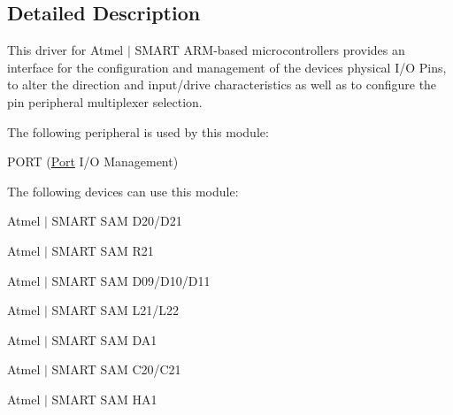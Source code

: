 \subsection{Detailed Description}
This driver for Atmel\textregistered{} $\vert$ S\+M\+A\+RT A\+RM\textregistered{}-\/based microcontrollers provides an interface for the configuration and management of the device\textquotesingle{}s physical I/O Pins, to alter the direction and input/drive characteristics as well as to configure the pin peripheral multiplexer selection.

The following peripheral is used by this module\+:
\begin{DoxyItemize}
\item P\+O\+RT (\mbox{\hyperlink{struct_port}{Port}} I/O Management)
\end{DoxyItemize}

The following devices can use this module\+:
\begin{DoxyItemize}
\item Atmel $\vert$ S\+M\+A\+RT S\+AM D20/\+D21
\item Atmel $\vert$ S\+M\+A\+RT S\+AM R21
\item Atmel $\vert$ S\+M\+A\+RT S\+AM D09/\+D10/\+D11
\item Atmel $\vert$ S\+M\+A\+RT S\+AM L21/\+L22
\item Atmel $\vert$ S\+M\+A\+RT S\+AM D\+A1
\item Atmel $\vert$ S\+M\+A\+RT S\+AM C20/\+C21
\item Atmel $\vert$ S\+M\+A\+RT S\+AM H\+A1
\end{DoxyItemize}


